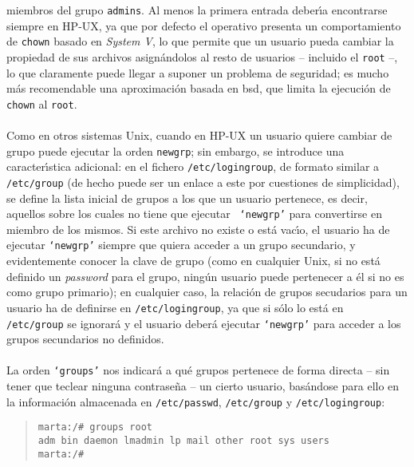 miembros del grupo {\tt admins}. Al menos la primera entrada deber\'{\i}a 
encontrarse siempre en HP-UX, ya que por defecto el operativo presenta un 
comportamiento de {\tt chown} basado en {\it System V}, lo que permite que un 
usuario pueda cambiar la propiedad de sus archivos asign\'andolos al resto de 
usuarios -- incluido el {\tt root} --, lo que claramente puede llegar a suponer 
un problema de seguridad; es mucho m\'as recomendable una aproximaci\'on basada
en {\sc bsd}, que limita la ejecuci\'on de {\tt chown} al {\tt root}.\\
\\Como en otros sistemas Unix, cuando en HP-UX un usuario quiere cambiar de
grupo puede ejecutar la orden {\tt newgrp}; sin embargo, se introduce una 
caracter\'{\i}stica adicional: en el fichero {\tt /etc/logingroup}, de formato
similar a {\tt /etc/group} (de hecho puede ser un enlace a este por cuestiones
de simplicidad), se define la lista inicial de grupos a los que un usuario 
pertenece, es decir, aquellos sobre los cuales no tiene que ejecutar {\tt 
`newgrp'} para convertirse en miembro de los mismos. Si este archivo no existe
o est\'a vac\'{\i}o, el usuario ha de ejecutar {\tt `newgrp'} siempre que
quiera acceder a un grupo secundario, y evidentemente conocer la clave de grupo
(como en cualquier Unix, si no est\'a definido un {\it password} para el grupo,
ning\'un usuario puede pertenecer a \'el si no es como grupo primario); en
cualquier caso, la relaci\'on de grupos secudarios para un usuario ha de
definirse en {\tt /etc/logingroup}, ya que si s\'olo lo est\'a en {\tt 
/etc/group} se ignorar\'a y el usuario deber\'a ejecutar {\tt `newgrp'} para 
acceder a los grupos secundarios no definidos.\\
\\La orden {\tt `groups'} nos indicar\'a a qu\'e grupos pertenece de forma
directa -- sin tener que teclear ninguna contrase\~na -- un cierto usuario, 
bas\'andose para ello en la informaci\'on almacenada en {\tt /etc/passwd},
{\tt /etc/group} y {\tt /etc/logingroup}:
\begin{quote}
\begin{verbatim}
marta:/# groups root
adm bin daemon lmadmin lp mail other root sys users
marta:/# 
\end{verbatim}
\end{quote}
